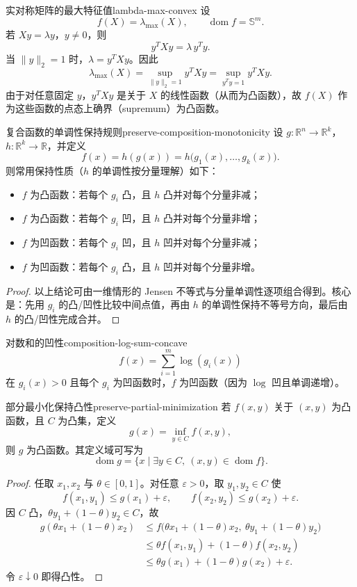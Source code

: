 \documentclass[11pt,a4paper]{article}
\begin{document}
\begin{example}{实对称矩阵的最大特征值}{lambda-max-convex}
设
\[
f(X)=\lambda_{\max}(X),\qquad \operatorname{dom}f=\mathbb{S}^m.
\]
若 $Xy=\lambda y$，$y\neq 0$，则
\[
y^TXy=\lambda\, y^Ty.
\]
当 $\|y\|_2=1$ 时，$\lambda=y^TXy$。因此
\[
\lambda_{\max}(X)=\sup_{\|y\|_2=1}y^TXy
=\sup_{y^Ty=1}y^TXy.
\]
由于对任意固定 $y$，$y^TXy$ 是关于 $X$ 的线性函数（从而为凸函数），故
$f(X)$ 作为这些函数的点态上确界（supremum）为凸函数。
\end{example}

\begin{theorem}{复合函数的单调性保持规则}{preserve-composition-monotonicity}
设 $g:\mathbb{R}^n\to\mathbb{R}^k$，$h:\mathbb{R}^k\to\mathbb{R}$，并定义
\[
f(x)=h(g(x))=h\bigl(g_1(x),\dots,g_k(x)\bigr).
\]
则常用保持性质（$h$ 的单调性按分量理解）如下：
\begin{itemize}
  \item $f$ 为凸函数：若每个 $g_i$ 凸，且 $h$ 凸并对每个分量非减；
  \item $f$ 为凸函数：若每个 $g_i$ 凹，且 $h$ 凸并对每个分量非增；
  \item $f$ 为凹函数：若每个 $g_i$ 凹，且 $h$ 凹并对每个分量非减；
  \item $f$ 为凹函数：若每个 $g_i$ 凸，且 $h$ 凹并对每个分量非增。
\end{itemize}
\end{theorem}

\begin{proof}
以上结论可由一维情形的 Jensen 不等式与分量单调性逐项组合得到。核心是：先用
$g_i$ 的凸/凹性比较中间点值，再由 $h$ 的单调性保持不等号方向，最后由 $h$ 的凸/凹性完成合并。
\end{proof}

\begin{example}{对数和的凹性}{composition-log-sum-concave}
\[
f(x)=\sum_{i=1}^m \log(g_i(x))
\]
在 $g_i(x)>0$ 且每个 $g_i$ 为凹函数时，$f$ 为凹函数（因为 $\log$ 凹且单调递增）。
\end{example}

\begin{theorem}{部分最小化保持凸性}{preserve-partial-minimization}
若 $f(x,y)$ 关于 $(x,y)$ 为凸函数，且 $C$ 为凸集，定义
\[
g(x)=\inf_{y\in C} f(x,y),
\]
则 $g$ 为凸函数。其定义域可写为
\[
\operatorname{dom}g=\{x\mid \exists y\in C,\ (x,y)\in\operatorname{dom}f\}.
\]
\end{theorem}

\begin{proof}
任取 $x_1,x_2$ 与 $\theta\in[0,1]$。对任意 $\varepsilon>0$，取 $y_1,y_2\in C$ 使
\[
f(x_1,y_1)\le g(x_1)+\varepsilon,\qquad
f(x_2,y_2)\le g(x_2)+\varepsilon.
\]
因 $C$ 凸，$\theta y_1+(1-\theta)y_2\in C$，故
\[
\begin{aligned}
g(\theta x_1+(1-\theta)x_2)
&\le f\bigl(\theta x_1+(1-\theta)x_2,\ \theta y_1+(1-\theta)y_2\bigr) \\
&\le \theta f(x_1,y_1)+(1-\theta)f(x_2,y_2) \\
&\le \theta g(x_1)+(1-\theta)g(x_2)+\varepsilon.
\end{aligned}
\]
令 $\varepsilon\downarrow 0$ 即得凸性。
\end{proof}
\end{document}
